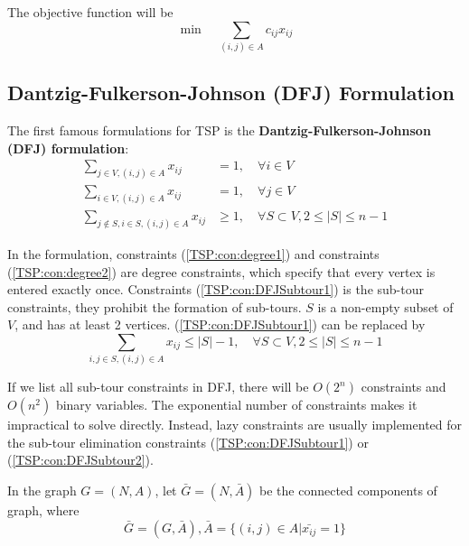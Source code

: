         The objective function will be
        \begin{equation}
            \min \quad \sum_{(i, j)\in A} c_{ij}x_{ij}
        \end{equation}

        \subsection{Dantzig-Fulkerson-Johnson (DFJ) Formulation}
            The first famous formulations for TSP is the \textbf{Dantzig-Fulkerson-Johnson (DFJ) formulation}:
            \begin{align}
                \sum_{j \in V, (i,j)\in A} x_{ij} & = 1, \quad \forall i \in V \label{TSP:con:degree1}\\
                \sum_{i \in V, (i,j)\in A} x_{ij} & = 1, \quad \forall j \in V \label{TSP:con:degree2}\\
                \sum_{j\notin S, i\in S, (i,j)\in A} x_{ij} & \ge 1, \quad \forall S \subset V, 2\le |S| \le n-1 \label{TSP:con:DFJSubtour1}
            \end{align}

            In the formulation, constraints (\ref{TSP:con:degree1}) and constraints (\ref{TSP:con:degree2}) are degree constraints, which specify that every vertex is entered exactly once. Constraints (\ref{TSP:con:DFJSubtour1}) is the sub-tour constraints, they prohibit the formation of sub-tours. $S$ is a non-empty subset of $V$, and has at least 2 vertices. (\ref{TSP:con:DFJSubtour1}) can be replaced by
            \begin{equation}
                \sum_{i, j \in S, (i, j) \in A} x_{ij} \le |S| - 1, \quad \forall S \subset V, 2\le |S| \le n-1\label{TSP:con:DFJSubtour2}
            \end{equation}

            If we list all sub-tour constraints in DFJ, there will be $O(2^n)$ constraints and $O(n^2)$ binary variables. The exponential number of constraints makes it impractical to solve directly. Instead, lazy constraints are usually implemented for the sub-tour elimination constraints (\ref{TSP:con:DFJSubtour1}) or (\ref{TSP:con:DFJSubtour2}).

             In the graph $G=(N, A)$, let $\bar{G}=(N, \bar{A})$ be the connected components of graph, where
            \begin{equation*}
                \bar{G}=(G, \bar{A}), \bar{A}=\{(i, j) \in A | \bar{x_{ij}}=1\}
            \end{equation*}
            
